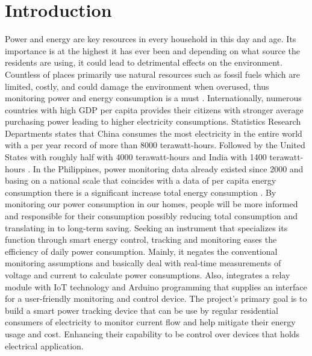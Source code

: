 \documentclass[conference, a4paper]{IEEEtran}
\begin{document}
\section{Introduction}
Power and energy are key resources in every household in this day and age. Its importance is at the highest it has ever been and depending on what source the residents are using, it could lead to detrimental effects on the environment. Countless of places primarily use natural resources such as fossil fuels which are limited, costly, and could damage the environment when overused, thus monitoring power and energy consumption is a must \cite{asanza_importance_2023}.
Internationally, numerous countries with high GDP per capita provides their citizens with stronger average purchasing power leading to higher electricity consumptions. Statistics Research Departments states that China consumes the most electricity in the entire world with a per year record of more than 8000 terawatt-hours. Followed by the United States with roughly half with 4000 terawatt-hours and India with 1400 terawatt-hours \cite{statista_research_department_electricity_2024}.
In the Philippines, power monitoring data already existed since 2000 and basing on a national scale that coincides with a data of per capita energy consumption there is a significant increase total energy consumption \cite{enerdata_philippines_2022}. By monitoring our power consumption in our homes, people will be more informed and responsible for their consumption possibly reducing total consumption and translating in to long-term saving.
Seeking an instrument that specializes its function through smart energy control, tracking and monitoring eases the efficiency of daily power consumption. Mainly, it negates the conventional monitoring assumptions and basically deal with real-time measurements of voltage and current to calculate power consumptions. Also, integrates a relay module with IoT technology and Arduino programming that supplies an interface for a user-friendly monitoring and control device.
The project’s primary goal is to build a smart power tracking device that can be use by regular residential consumers of electricity to monitor current flow and help mitigate their energy usage and cost. Enhancing their capability to be control over devices that holds electrical application.
\end{document}

